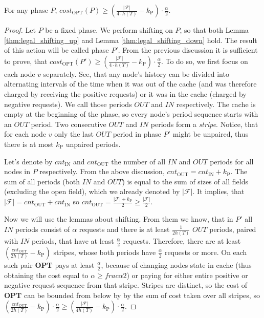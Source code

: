 \begin{lemma}
For any phase $P$, $cost_{\mathrm{OPT}}(P) \geq
(\frac{|\mathcal{F}|}{4 \cdot h(T)} -k_{\mathrm{P}}) \cdot \frac{\alpha}{2}$.
\label{thm:opt_bound_with_F} \end{lemma} \begin{proof} Let $P$ be a fixed phase.
We perform shifting on $P$, so that both Lemma \ref{thm:legal_shifting_up} and
Lemma \ref{thm:legal_shifting_down} hold. The result of this action will be
called phase $P'$. From the previous discussion it is sufficient to prove, that
$cost_{\mathrm{OPT}}(P') \geq (\frac{|\mathcal{F}|}{4 \cdot h(T)}-k_{\mathrm{P}}) \cdot
\frac{\alpha}{2}$. To do so, we first focus on each node $v$ separately. See,
that any node's history can be divided into alternating intervals of the time
when it was out of the cache (and was therefore charged by receiving the
positive requests) or it was in the cache (charged by negative requests). We
call those periods $OUT$ and $IN$ respectively. The cache is empty at the
beginning of the phase, so every node's period sequence starts with an $OUT$
period. Two consecutive $OUT$ and $IN$ periods form a \textit{stripe}. Notice,
that for each node $v$ only the last $OUT$ period in phase $P'$ might be
unpaired, thus there is at most $k_{\mathrm{P}}$ unpaired periods.

Let's denote by $cnt_{\mathrm{IN}}$ and $cnt_{\mathrm{OUT}}$ the number of all
$IN$ and $OUT$ periods for all nodes in $P$ respectively. From the above
discussion, $cnt_{\mathrm{OUT}} = cnt_{\mathrm{IN}} + k_{\mathrm{P}}$. The sum of all
periods (both $IN$ and $OUT$) is equal to the sum of sizes of all fields
(excluding the open field), which we already denoted by $|\mathcal{F}|$. It
implies, that $|\mathcal{F}| = cnt_{\mathrm{OUT}} + cnt_{\mathrm{IN}}$ so
$cnt_{\mathrm{OUT}} = \frac{|\mathcal{F}| + k_{\mathrm{P}}}{2} \geq
\frac{|\mathcal{F}|}{2}.$

Now we will use the lemmas about shifting. From them we know, that in $P'$ all
$IN$ periods consist of $\alpha$ requests and there is at least
$\frac{1}{2h(T)}$ $OUT$ periods, paired with $IN$ periods, that have at least
$\frac{\alpha}{2}$ requests. Therefore, there are at least
$(\frac{cnt_{\mathrm{OUT}}}{2h(T)} - k_{\mathrm{P}})$ stripes, whose both periods have
$\frac{\alpha}{2}$ requests or more. On each such pair \textbf{OPT} pays at
least $\frac{\alpha}{2}$, because of changing nodes state in cache (thus
obtaining the cost equal to $\alpha \geq frac{\alpha}{2}$) or paying for either
entire positive or negative request sequence from that stripe.  Stripes are distinct, so the
cost of \textbf{OPT} can be bounded from below by by the sum of cost taken over all stripes, so
$(\frac{cnt_{\mathrm{OUT}}}{2h(T)} - k_{\mathrm{P}}) \cdot \frac{\alpha}{2} \geq
(\frac{|\mathcal{F}|}{4h(T)} - k_{\mathrm{P}}) \cdot  \frac{\alpha}{2}$.  \end{proof}


